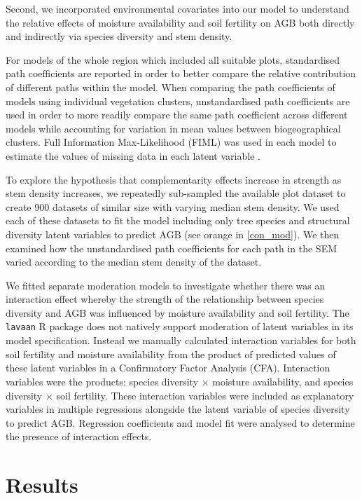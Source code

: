 \documentclass[11pt,a4paper]{article}
\begin{document}
Second, we incorporated environmental covariates into our model to understand the relative effects of moisture availability and soil fertility on AGB both directly and indirectly via species diversity and stem density. 

For models of the whole region which included all suitable plots, standardised path coefficients are reported in order to better compare the relative contribution of different paths within the model. When comparing the path coefficients of models using individual vegetation clusters, unstandardised path coefficients are used in order to more readily compare the same path coefficient across different models while accounting for variation in mean values between biogeographical clusters. Full Information Max-Likelihood (FIML) was used in each model to estimate the values of missing data in each latent variable \citep{Cham2017}.

To explore the hypothesis that complementarity effects increase in strength as stem density increases, we repeatedly sub-sampled the available plot dataset to create 900 datasets of similar size with varying median stem density. We used each of these datasets to fit the model including only tree species and structural diversity latent variables to predict AGB (see orange in \autoref{con_mod}). We then examined how the unstandardised path coefficients for each path in the SEM varied according to the median stem density of the dataset.

We fitted separate moderation models to investigate whether there was an interaction effect whereby the strength of the relationship between species diversity and AGB was influenced by moisture availability and soil fertility. The \verb|lavaan| R package does not natively support moderation of latent variables in its model specification. Instead we manually calculated interaction variables for both soil fertility and moisture availability from the product of predicted values of these latent variables in a Confirmatory Factor Analysis (CFA). Interaction variables were the products: species diversity $\times$ moisture availability, and species diversity $\times$ soil fertility. These interaction variables were included as explanatory variables in multiple regressions alongside the latent variable of species diversity to predict AGB. Regression coefficients and model fit were analysed to determine the presence of interaction effects.

\section{Results}
\end{document}
